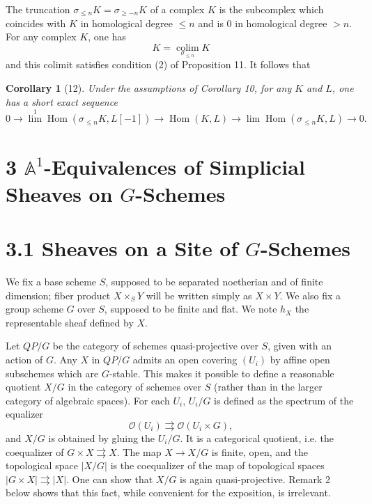\documentclass[11pt]{article}
\newcommand{\Aone}{\mathbb A^1}
\newcommand{\Hom}{\operatorname{Hom}}
\theoremstyle{deligne}
\newtheorem*{corollary*}{Corollary}
\begin{document}
The truncation \(\sigma_{\le n}K=\sigma_{\ge -n}K\) of a complex \(K\) is the subcomplex which coincides with \(K\) in homological degree \(\le n\) and is \(0\) in homological degree \(>n\). For any complex \(K\), one has
\[
K=\operatorname*{colim}_{\sigma_{\le n}}K
\]
and this colimit satisfies condition (2) of Proposition 11. It follows that

\begin{corollary*}[12]
Under the assumptions of Corollary 10, for any \(K\) and \(L\), one has a short exact sequence
\[
0\longrightarrow\operatorname{lim}^1\Hom(\sigma_{\le n}K,L[-1])
\longrightarrow\Hom(K,L)
\longrightarrow\operatorname{lim}\Hom(\sigma_{\le n}K,L)\longrightarrow0.
\]
\end{corollary*}

\section*{3 \(\Aone\)-Equivalences of Simplicial Sheaves on \(G\)-Schemes}

\section*{3.1 Sheaves on a Site of \(G\)-Schemes}

We fix a base scheme \(S\), supposed to be separated noetherian and of finite dimension; fiber product \(X\times_S Y\) will be written simply as \(X\times Y\). We also fix a group scheme \(G\) over \(S\), supposed to be finite and flat. We note \(h_X\) the representable sheaf defined by \(X\).

Let \(QP/G\) be the category of schemes quasi-projective over \(S\), given with an action of \(G\). Any \(X\) in \(QP/G\) admits an open covering \((U_i)\) by affine open subschemes which are \(G\)-stable. This makes it possible to define a reasonable quotient \(X/G\) in the category of schemes over \(S\) (rather than in the larger category of algebraic spaces). For each \(U_i\), \(U_i/G\) is defined as the spectrum of the equalizer
\[
\mathcal O(U_i)\rightrightarrows\mathcal O(U_i\times G),
\]
and \(X/G\) is obtained by gluing the \(U_i/G\). It is a categorical quotient, i.e. the coequalizer of \(G\times X\rightrightarrows X\). The map \(X\to X/G\) is finite, open, and the topological space \(|X/G|\) is the coequalizer of the map of topological spaces \(|G\times X|\rightrightarrows |X|\). One can show that \(X/G\) is again quasi-projective. Remark 2 below shows that this fact, while convenient for the exposition, is irrelevant.
\end{document}
